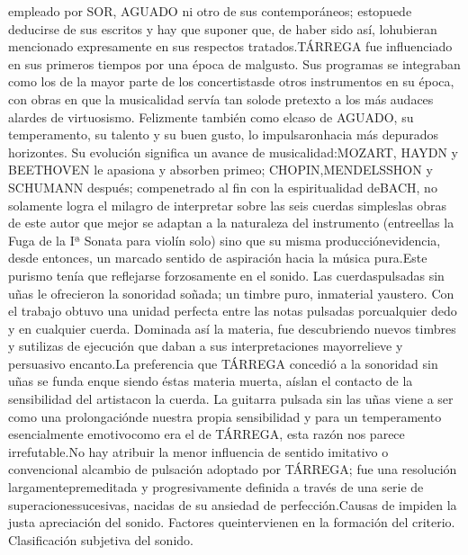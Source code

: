 \documentclass[
10pt, %
a4paper, %
oneside, %
headinclude,footinclude, %
BCOR5mm, %
]{scrartcl}
\begin{document}
{empleado por SOR, AGUADO ni otro de sus contemporáneos; estopuede deducirse de sus escritos y hay que suponer que, de haber sido así, lohubieran mencionado expresamente en sus respectos tratados.TÁRREGA fue influenciado en sus primeros tiempos por una época de malgusto. Sus programas se integraban como los de la mayor parte de los concertistasde otros instrumentos en su época, con obras en que la musicalidad servía tan solode pretexto a los más audaces alardes de virtuosismo. Felizmente también como elcaso de AGUADO, su temperamento, su talento y su buen gusto, lo impulsaronhacia más depurados horizontes. Su evolución significa un avance de musicalidad:MOZART, HAYDN y BEETHOVEN le apasiona y absorben primeo; CHOPIN,MENDELSSHON y SCHUMANN después; compenetrado al fin con la espiritualidad deBACH, no solamente logra el milagro de interpretar sobre las seis cuerdas simpleslas obras de este autor que mejor se adaptan a la naturaleza del instrumento (entreellas la Fuga de la Iª Sonata para violín solo) sino que su misma producciónevidencia, desde entonces, un marcado sentido de aspiración hacia la música pura.Este purismo tenía que reflejarse forzosamente en el sonido. Las cuerdaspulsadas sin uñas le ofrecieron la sonoridad soñada; un timbre puro, inmaterial yaustero. Con el trabajo obtuvo una unidad perfecta entre las notas pulsadas porcualquier dedo y en cualquier cuerda. Dominada así la materia, fue descubriendo nuevos timbres y sutilizas de ejecución que daban a sus interpretaciones mayorrelieve y persuasivo encanto.La preferencia que TÁRREGA concedió a la sonoridad sin uñas se funda enque siendo éstas materia muerta, aíslan el contacto de la sensibilidad del artistacon la cuerda. La guitarra pulsada sin las uñas viene a ser como una prolongaciónde nuestra propia sensibilidad y para un temperamento esencialmente emotivocomo era el de TÁRREGA, esta razón nos parece irrefutable.No hay atribuir la menor influencia de sentido imitativo o convencional alcambio de pulsación adoptado por TÁRREGA; fue una resolución largamentepremeditada y progresivamente definida a través de una serie de superacionessucesivas, nacidas de su ansiedad de perfección.Causas de impiden la justa apreciación del sonido. Factores queintervienen en la formación del criterio. Clasificación subjetiva del sonido.
}
\end{document}
